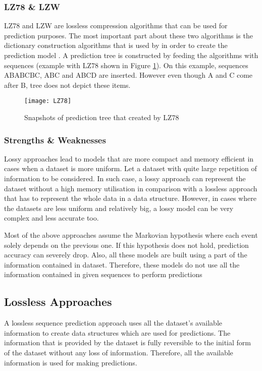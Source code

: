 \subsubsection{LZ78 \& LZW}
LZ78 and LZW are lossless compression algorithms that can be used for prediction purposes. The most important part about these two algorithms is the dictionary construction algorithms that is used by \citeauthor{Moghaddam_Kabir} \citeyear{Moghaddam_Kabir} in order to create the prediction model \cite{Moghaddam_Kabir}. A prediction tree is constructed by feeding the algorithms with sequences (example with LZ78 shown in Figure \ref{fig:LZ78}). On this example, sequences ABABCBC, ABC and ABCD are inserted. However even though A and C come after B, tree does not depict these items.

\begin{figure}[h]
    \centering
    \texttt{[image: LZ78]}
    \caption{Snapshots of prediction tree that created by LZ78}
    \label{fig:LZ78}
\end{figure}


\subsubsection{Strengths \& Weaknesses}
Lossy approaches lead to models that are more compact and memory efficient in cases when a dataset is more uniform. Let a dataset with quite large repetition of information to be considered. In such case, a lossy approach can represent the dataset without a high memory utilisation in comparison with a lossless approach that has to represent the whole data in a data structure. However, in cases where the datasets are less uniform and relatively big, a lossy model can be very complex and less accurate too.
\par Most of the above approaches assume the Markovian hypothesis where each event solely depends on the previous one. If this hypothesis does not hold, prediction accuracy can severely drop. Also, all these models are built using a part of the information contained in dataset. Therefore, these models do not use all the information contained in given sequences to perform predictions \citep{gueniche_fournier-viger_raman_tseng_2015,gueniche_fournier-viger_tseng_2013}
\subsection{Lossless Approaches}
A lossless sequence prediction approach uses all the dataset's available information to create data structures which are used for predictions. The information that is provided by the dataset is fully reversible to the initial form of the dataset without any loss of information. Therefore, all the available information is used for making predictions.


